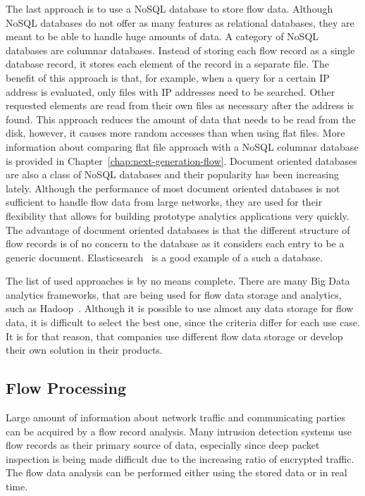 The last approach is to use a NoSQL database to store flow data. Although NoSQL databases do not offer as many features as relational databases, they are meant to be able to handle huge amounts of data. A category of NoSQL databases are columnar databases. Instead of storing each flow record as a single database record, it stores each element of the record in a separate file. The benefit of this approach is that, for example, when a query for a certain IP address is evaluated, only files with IP addresses need to be searched. Other requested elements are read from their own files as necessary after the address is found. This approach reduces the amount of data that needs to be read from the disk, however, it causes more random accesses than when using flat files. More information about comparing flat file approach with a NoSQL columnar database is provided in Chapter~\ref{chap:next-generation-flow}. Document oriented databases are also a class of NoSQL databases and their popularity has been increasing lately. Although the performance of most document oriented databases is not sufficient to handle flow data from large networks, they are used for their flexibility that allows for building prototype analytics applications very quickly. The advantage of document oriented databases is that the different structure of flow records is of no concern to the database as it considers each entry to be a generic document. Elasticsearch~\cite{Gormley-2015-Elasticsearch} is a good example of a such a database.

The list of used approaches is by no means complete. There are many Big Data analytics frameworks, that are being used for flow data storage and analytics, such as Hadoop~\cite{Lee-2012-Toward}. Although it is possible to use almost any data storage for flow data, it is difficult to select the best one, since the criteria differ for each use case. It is for that reason, that companies use different flow data storage or develop their own solution in their products.


\subsection{Flow Processing}\label{subsec:flow-processing}

Large amount of information about network traffic and communicating parties can be acquired by a flow record analysis. Many intrusion detection systems use flow records as their primary source of data, especially since deep packet inspection is being made difficult due to the increasing ratio of encrypted traffic. The flow data analysis can be performed either using the stored data or in real time.

